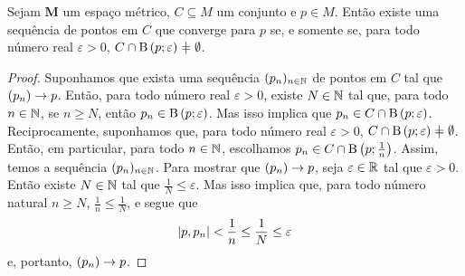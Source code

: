 \begin{proposition}
Sejam $\bm M$ um espaço métrico, $C \subseteq M$ um conjunto e $p \in M$. Então existe uma sequência de pontos em $C$ que converge para $p$ se, e somente se, para todo número real $\varepsilon > 0$, $C \cap \bola{p}{\varepsilon} \neq \emptyset$.
\end{proposition}
\begin{proof}
	Suponhamos que exista uma sequência $(p_n)_{n \in \mathbb{N}}$ de pontos em $C$ tal que $(p_n) \rightarrow p$. Então, para todo número real $\varepsilon > 0$, existe $N \in \mathbb{N}$ tal que, para todo $n \in \mathbb{N}$, se $n \geq N$, então $p_n \in \mathrm{B}\left(p; \varepsilon\right)$. Mas isso implica que $p_n \in C \cap \mathrm{B}\left(p; \varepsilon\right)$. Reciprocamente, suponhamos que, para todo número real $\varepsilon > 0$, $C \cap \bola{p}{\varepsilon} \neq \emptyset$. Então, em particular, para todo $n \in \mathbb{N}$, escolhamos $p_n \in C \cap \mathrm{B}\left(p; \frac{1}{n}\right)$. Assim, temos a sequência $(p_n)_{n \in \mathbb{N}}$. Para mostrar que $(p_n) \rightarrow p$, seja $\varepsilon \in \mathbb{R}$ tal que $\varepsilon > 0$. Então existe $N \in \mathbb{N}$ tal que $\frac{1}{N} \leq \varepsilon$. Mas isso implica que, para todo número natural $n \geq N$, $\frac{1}{n} \leq \frac{1}{N}$, e segue que
	\begin{equation*}
	\left\vert{p},{p_n}\right\vert < \frac{1}{n} \leq \frac{1}{N} \leq \varepsilon
	\end{equation*}
e, portanto, $(p_n) \rightarrow p$.
\end{proof}

